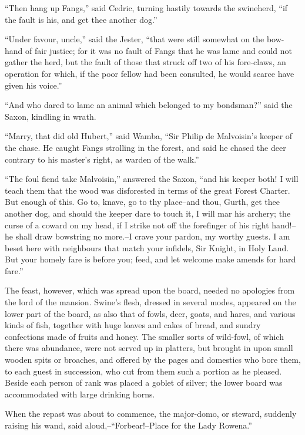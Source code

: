 ``Then hang up Fangs,'' said Cedric, turning hastily towards the
swineherd, ``if the fault is his, and get thee another dog.''

``Under favour, uncle,'' said the Jester, ``that were still somewhat on
the bow-hand of fair justice; for it was no fault of Fangs that he was
lame and could not gather the herd, but the fault of those that struck
off two of his fore-claws, an operation for which, if the poor fellow
had been consulted, he would scarce have given his voice.''

``And who dared to lame an animal which belonged to my bondsman?'' said
the Saxon, kindling in wrath.

``Marry, that did old Hubert,'' said Wamba, ``Sir Philip de Malvoisin's
keeper of the chase. He caught Fangs strolling in the forest, and said
he chased the deer contrary to his master's right, as warden of the
walk.''

``The foul fiend take Malvoisin,'' answered the Saxon, ``and his keeper
both! I will teach them that the wood was disforested in terms of the
great Forest Charter. But enough of this. Go to, knave, go to thy
place--and thou, Gurth, get thee another dog, and should the keeper dare
to touch it, I will mar his archery; the curse of a coward on my head,
if I strike not off the forefinger of his right hand!--he shall draw
bowstring no more.--I crave your pardon, my worthy guests. I am beset
here with neighbours that match your infidels, Sir Knight, in Holy Land.
But your homely fare is before you; feed, and let welcome make amends
for hard fare.''

The feast, however, which was spread upon the board, needed no apologies
from the lord of the mansion. Swine's flesh, dressed in several modes,
appeared on the lower part of the board, as also that of fowls, deer,
goats, and hares, and various kinds of fish, together with huge loaves
and cakes of bread, and sundry confections made of fruits and honey. The
smaller sorts of wild-fowl, of which there was abundance, were not
served up in platters, but brought in upon small wooden spits or
broaches, and offered by the pages and domestics who bore them, to each
guest in succession, who cut from them such a portion as he pleased.
Beside each person of rank was placed a goblet of silver; the lower
board was accommodated with large drinking horns.

When the repast was about to commence, the major-domo, or steward,
suddenly raising his wand, said aloud,--``Forbear!--Place for the Lady
Rowena.''

